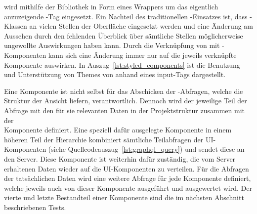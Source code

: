  wird mithilfe der Bibliothek  in Form eines Wrappers um das eigentlich anzuzeigende -Tag eingesetzt. Ein Nachteil des traditionellen -Einsatzes ist, dass -Klassen an vielen Stellen der Oberfläche eingesetzt werden und eine Änderung am Aussehen durch den fehlenden Überblick über sämtliche Stellen möglicherweise ungewollte Auswirkungen haben kann. Durch die Verknüpfung von  mit -Komponenten kann sich eine Änderung immer nur auf die jeweils verknüpfte Komponente auswirken. In Auszug~\ref{lst:styled_components} ist die Benutzung und Unterstützung von Themes von  anhand eines  input-Tags dargestellt.



Eine Komponente ist nicht selbst für das Abschicken der -Abfragen, welche die Struktur der Ansicht liefern, verantwortlich. Dennoch wird der jeweilige Teil der Abfrage mit den für sie relevanten Daten in der Projektstruktur zusammen mit der\\ Komponente definiert. Eine speziell dafür ausgelegte Komponente in einem höheren Teil der Hierarchie kombiniert sämtliche Teilabfragen der UI-Komponenten (siehe Quellcodeauszug~\ref{lst:graphql_query}) und sendet diese an den Server. Diese Komponente ist weiterhin dafür zuständig, die vom Server erhaltenen Daten wieder auf die UI-Komponenten zu verteilen. Für die Abfragen der tatsächlichen Daten wird eine weitere Abfrage für jede Komponente definiert, welche jeweils auch von dieser Komponente ausgeführt und ausgewertet wird.
Der vierte und letzte Bestandteil einer Komponente sind die im nächsten Abschnitt beschriebenen Tests.



